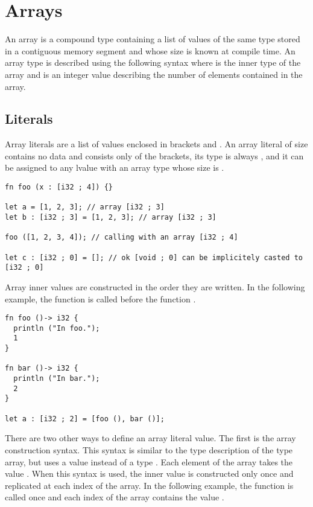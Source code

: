 \section{Arrays}

 An array is a compound type containing a list of values of the same type stored
 in a contiguous memory segment and whose size is known at compile time. An
 array type is described using the following syntax \token{[T ; N]} where
  is the inner type of the array and  is an integer value
 describing the number of elements contained in the array.

\subsection {Literals}

Array literals are a list of values enclosed in brackets \token{[} and
  \token{]}. An array literal of size  contains no data and consists
only of the brackets, its type is always \token{[void ; 0]}, and it can be
assigned to any lvalue with an array type whose size is .

\begin{lstlisting}[style=coloredverbatim]
fn foo (x : [i32 ; 4]) {}

let a = [1, 2, 3]; // array [i32 ; 3]
let b : [i32 ; 3] = [1, 2, 3]; // array [i32 ; 3]

foo ([1, 2, 3, 4]); // calling with an array [i32 ; 4]

let c : [i32 ; 0] = []; // ok [void ; 0] can be implicitely casted to [i32 ; 0]
\end{lstlisting}

Array inner values are constructed in the order they are written. In the
following example, the function  is called before the function
.

\begin{lstlisting}[style=coloredverbatim]
fn foo ()-> i32 {
  println ("In foo.");
  1
}

fn bar ()-> i32 {
  println ("In bar.");
  2
}

let a : [i32 ; 2] = [foo (), bar ()];
\end{lstlisting}

There are two other ways to define an array literal value. The first is the
array construction syntax. This syntax is similar to the type description of the
type array, but uses a value instead of a type \token{[V ; N]}. Each element of
the array takes the value . When this syntax is used, the inner value
is constructed only once and replicated at each index of the array. In the
following example, the function  is called once and each index of
the array contains the value .

